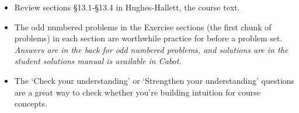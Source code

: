 \documentclass[12pt,letterpaper]{exam}
\begin{document}
 \pdfpageheight 11in 
  \pdfpagewidth 8.5in

\begin{itemize}
    \item Review sections \S 13.1-\S 13.4 in Hughes-Hallett, the course text.
    \item The odd numbered problems in the Exercise sections (the first chunk of problems) in each section are worthwhile practice for before a problem set.  \emph{Answers are in the back for odd numbered problems, and solutions are in the student solutions manual is available in Cabot.}
    \item The `Check your understanding' or `Strengthen your understanding' questions are a great way to check whether you're building intuition for course concepts. %
\end{itemize}
\end{document}
